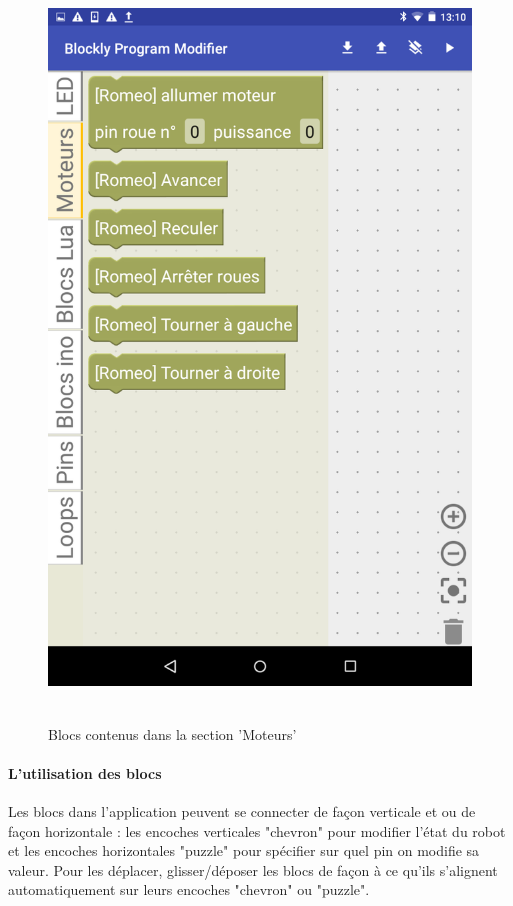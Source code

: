 \documentclass[12pt,francais]{report}
\begin{document}
\begin{figure}[!h]
\centering
\includegraphics[scale=0.3]{./images/tool.png}~\\[1.5cm]
\caption{Blocs contenus dans la section 'Moteurs'}
\end{figure}

\paragraph*{L'utilisation des blocs\\}
\medskip
Les blocs dans l'application peuvent se connecter de façon verticale et ou de façon horizontale : les encoches verticales "chevron" pour modifier l'état du robot et les encoches horizontales "puzzle" pour spécifier sur quel pin on modifie sa valeur. Pour les déplacer, glisser/déposer les blocs de façon à ce qu'ils s'alignent automatiquement sur leurs encoches "chevron" ou  "puzzle".\\
\end{document}
